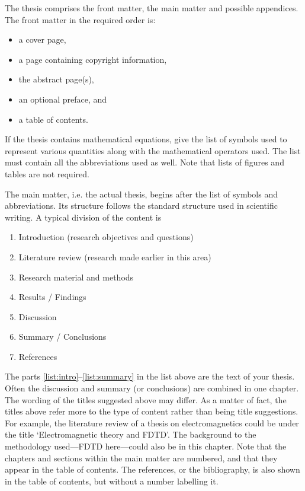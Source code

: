 \documentclass[english, 12pt, a4paper, sci, utf8, a-2b, online]{aaltothesis}
\begin{document}
The thesis comprises the front matter, the main matter and possible appendices.
The front matter in the required order is:

\begin{itemize}
	\item a cover page,
	\item a page containing copyright information,
	\item the abstract page(s),
	\item an optional preface, and
	\item a table of contents.
\end{itemize}

If the thesis contains mathematical equations, give the list of symbols used to 
represent various quantities along with the mathematical operators used.
The list must contain all the abbreviations used as well. Note that lists of
figures and tables are not required.

The main matter, i.e. the actual thesis, begins after the list of symbols and 
abbreviations. Its structure follows the standard structure used in scientific 
writing. A typical division of the content is
\begin{enumerate}
	\item \label{list:intro} Introduction (research objectives and questions)
	\item Literature review (research made earlier in this area)
	\item Research material and methods
	\item Results / Findings
	\item Discussion
	\item \label{list:summary} Summary / Conclusions
	\item References
\end{enumerate}
The parts \ref{list:intro}--\ref{list:summary} in the list above are the text  
of your thesis. Often the discussion and summary (or conclusions) are combined 
in one chapter. The wording of the titles suggested above may differ. As a 
matter of fact, the titles above refer more to the type of content rather than 
being title suggestions. For example, the literature review of a thesis on 
electromagnetics could be under the title ‘Electromagnetic theory and FDTD’. 
The background to the methodology used---FDTD here---could also be in this 
chapter. Note that the chapters and sections within the main matter are 
numbered, and that they appear in the table of contents. The references, or the 
bibliography, is also shown in the table of contents, but without a number 
labelling it.
\end{document}
